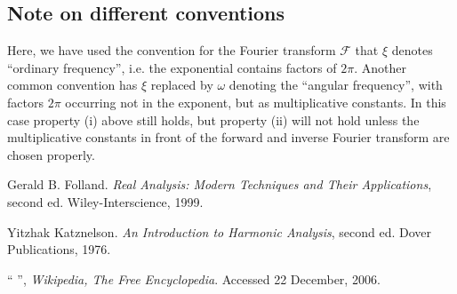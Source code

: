 \documentclass[12pt]{article}
\newcommand{\FT}{\mathcal{F}}
\begin{document}
\subsection{Note on different conventions}

Here, we have used the convention for the Fourier transform $\FT$ that $\xi$ denotes ``ordinary frequency'', i.e. the exponential contains factors of $2\pi$.  Another common convention has $\xi$ replaced by $\omega$ denoting the ``angular frequency'', with factors $2\pi$ occurring not in the exponent, but as multiplicative constants. In this case property (i) above still holds,
but property (ii) will not hold unless the multiplicative constants
in front of the forward and inverse Fourier transform are chosen properly.

\begin{thebibliography}{3}
Gerald B. Folland. \emph{Real Analysis: Modern Techniques and Their Applications}, second ed. Wiley-Interscience, 1999.

Yitzhak Katznelson. \emph{An Introduction to Harmonic Analysis}, second ed. Dover Publications, 1976.

``
'', \emph{Wikipedia, The Free Encyclopedia}.  Accessed 22 December, 2006.

\end{thebibliography}


\end{document}
